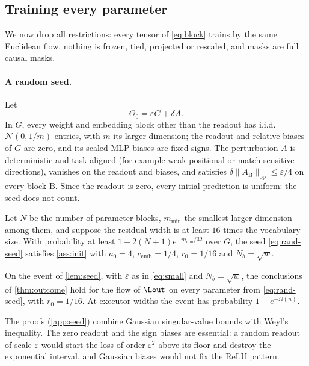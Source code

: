 \subsection{Training every parameter}\label{sec:full}
We now drop all restrictions: every tensor of \cref{eq:block} trains by the same Euclidean flow, nothing is frozen, tied, projected or rescaled, and masks are full causal masks.

\paragraph{A random seed.} Let
\begin{equation}\label{eq:rand-seed}
\Theta_0=\varepsilon G+\delta A .
\end{equation}
In $G$, every weight and embedding block other than the readout has i.i.d.\ $\mathcal N(0,1/m)$ entries, with $m$ its larger dimension; the readout and relative biases of $G$ are zero, and its scaled MLP biases are fixed signs. The perturbation $A$ is deterministic and task-aligned (for example weak positional or match-sensitive directions), vanishes on the readout and biases, and satisfies $\delta\|A_{\mathrm B}\|_{\mathrm{op}}\le\varepsilon/4$ on every block $\mathrm B$. Since the readout is zero, every initial prediction is uniform: the seed does not count.

\begin{lemma}\label{lem:seed}
Let $N$ be the number of parameter blocks, $m_{\min}$ the smallest larger-dimension among them, and suppose the residual width is at least $16$ times the vocabulary size. With probability at least $1-2(N+1)e^{-m_{\min}/32}$ over $G$, the seed \cref{eq:rand-seed} satisfies \cref{ass:init} with $a_0=4$, $c_{\mathrm{emb}}=1/4$, $r_0=1/16$ and $N_b=\sqrt w$.
\end{lemma}

\begin{proposition}\label{prop:random-plateau}
On the event of \cref{lem:seed}, with $\varepsilon$ as in \cref{eq:small} and $N_b=\sqrt w$, the conclusions of \cref{thm:outcome} hold for the flow of $\Lout$ on every parameter from \cref{eq:rand-seed}, with $r_0=1/16$. At executor widths the event has probability $1-e^{-\Omega(n)}$.
\end{proposition}
The proofs (\cref{app:seed}) combine Gaussian singular-value bounds \citep[Chapter~7]{vershynin2018high} with Weyl's inequality. The zero readout and the sign biases are essential: a random readout of scale $\varepsilon$ would start the loss of order $\varepsilon^2$ above its floor and destroy the exponential interval, and Gaussian biases would not fix the ReLU pattern.

